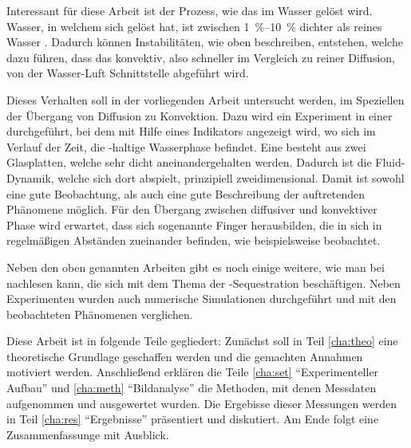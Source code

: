 Interessant für diese Arbeit ist der Prozess, wie das \COT im Wasser gelöst wird. Wasser, in welchem sich \COT gelöst hat, ist zwischen \SIrange{1}{10}{\percent} dichter als reines Wasser \citep{garcia}. Dadurch können Instabilitäten, wie oben beschreiben, entstehen, welche dazu führen, dass das \COT konvektiv, also schneller im Vergleich zu reiner Diffusion, von der Wasser-Luft Schnittstelle abgeführt wird.

Dieses Verhalten soll in der vorliegenden Arbeit untersucht werden, im Speziellen der Übergang von Diffusion zu Konvektion.
Dazu wird ein Experiment in einer \HSC durchgeführt, bei dem mit Hilfe eines Indikators angezeigt wird, wo sich im Verlauf der Zeit, die \COT-haltige Wasserphase befindet. 
Eine \HSC besteht aus zwei Glasplatten, welche sehr dicht aneinandergehalten werden. Dadurch ist die Fluid-Dynamik, welche sich dort abspielt, prinzipiell zweidimensional. Damit ist sowohl eine gute Beobachtung, als auch eine gute Beschreibung der auftretenden Phänomene möglich.
Für den Übergang zwischen diffusiver und konvektiver Phase wird erwartet, dass sich sogenannte Finger herausbilden, die in sich in regelmäßigen Abständen zueinander befinden, wie beispielsweise \cite{fernandez} beobachtet.

Neben den oben genannten Arbeiten gibt es noch einige weitere, wie man bei \cite{kneafsy} nachlesen kann, die sich mit dem Thema der \COT-Sequestration beschäftigen. Neben Experimenten wurden auch numerische Simulationen durchgeführt und mit den beobachteten Phänomenen verglichen. 

Diese Arbeit ist in folgende Teile gegliedert: Zunächst soll in Teil \ref{cha:theo} eine theoretische Grundlage geschaffen werden und die gemachten Annahmen motiviert werden. Anschließend erklären die Teile \ref{cha:set} "`Experimenteller Aufbau"' und \ref{cha:meth} "`Bildanalyse"' die Methoden, mit denen Messdaten aufgenommen und ausgewertet wurden. Die Ergebisse dieser Messungen werden in Teil \ref{cha:res} "`Ergebnisse"' präsentiert und diskutiert. Am Ende folgt eine Zusammenfassunge mit Ausblick.

